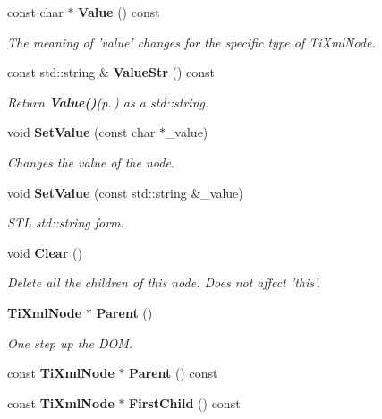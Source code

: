 \begin{CompactItemize}
\item 
const char $\ast$ {\bf Value} () const
\begin{CompactList}\small\item\em The meaning of 'value' changes for the specific type of Ti\-Xml\-Node. \item\end{CompactList}\item 
const std::string \& {\bf Value\-Str} () const
\begin{CompactList}\small\item\em Return {\bf Value()}{\rm (p.\,\pageref{classTiXmlNode_TiXmlUnknowna7})} as a std::string. \item\end{CompactList}\item 
void {\bf Set\-Value} (const char $\ast$\_\-value)
\begin{CompactList}\small\item\em Changes the value of the node. \item\end{CompactList}\item 
void {\bf Set\-Value} (const std::string \&\_\-value)\label{classTiXmlNode_TiXmlUnknowna10}

\begin{CompactList}\small\item\em STL std::string form. \item\end{CompactList}\item 
void {\bf Clear} ()\label{classTiXmlNode_TiXmlUnknowna11}

\begin{CompactList}\small\item\em Delete all the children of this node. Does not affect 'this'. \item\end{CompactList}\item 
{\bf Ti\-Xml\-Node} $\ast$ {\bf Parent} ()\label{classTiXmlNode_TiXmlUnknowna12}

\begin{CompactList}\small\item\em One step up the DOM. \item\end{CompactList}\item 
const {\bf Ti\-Xml\-Node} $\ast$ {\bf Parent} () const\label{classTiXmlNode_TiXmlUnknowna13}

\item 
const {\bf Ti\-Xml\-Node} $\ast$ {\bf First\-Child} () const\label{classTiXmlNode_TiXmlUnknowna14}


\end{CompactItemize}
